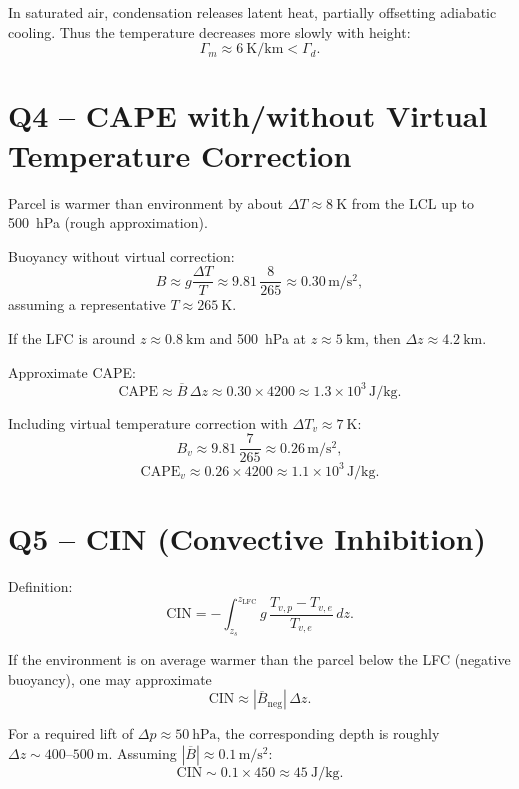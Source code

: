 \documentclass[12pt,a4paper]{article}
\begin{document}
In saturated air, condensation releases latent heat, partially
offsetting adiabatic cooling. Thus the temperature decreases more
slowly with height:
\[
\Gamma_m \approx \SI{6}{\kelvin\per\kilo\meter}
< \Gamma_d.
\]

\section*{Q4 -- CAPE with/without Virtual Temperature Correction}

Parcel is warmer than environment by about
\(\Delta T \approx \SI{8}{\kelvin}\) from the LCL up to \SI{500}{\hecto\pascal}
(rough approximation).

Buoyancy without virtual correction:
\[
B \approx g \frac{\Delta T}{T}
\approx 9.81 \,\frac{8}{265}
\approx 0.30 \,\si{\meter\per\second\squared},
\]
assuming a representative \(T \approx \SI{265}{\kelvin}\).

If the LFC is around \(z \approx \SI{0.8}{\kilo\meter}\) and
\SI{500}{\hecto\pascal} at \(z \approx \SI{5}{\kilo\meter}\),
then \(\Delta z \approx \SI{4.2}{\kilo\meter}\).

Approximate CAPE:
\[
\text{CAPE} \approx \overline{B}\,\Delta z
\approx 0.30 \times 4200
\approx 1.3\times 10^3 \,\si{\joule\per\kilo\gram}.
\]

Including virtual temperature correction with
\(\Delta T_v \approx \SI{7}{\kelvin}\):
\[
B_v \approx 9.81 \,\frac{7}{265}
\approx 0.26 \,\si{\meter\per\second\squared},
\]
\[
\text{CAPE}_v \approx 0.26 \times 4200
\approx 1.1\times 10^3 \,\si{\joule\per\kilo\gram}.
\]

\section*{Q5 -- CIN (Convective Inhibition)}

Definition:
\[
\text{CIN} = -\int_{z_s}^{z_{\text{LFC}}}
g\,\frac{T_{v,p} - T_{v,e}}{T_{v,e}}\,dz.
\]

If the environment is on average warmer than the parcel
below the LFC (negative buoyancy), one may approximate
\[
\text{CIN} \approx |\overline{B}_{\text{neg}}|\,\Delta z.
\]

For a required lift of \(\Delta p \approx \SI{50}{\hecto\pascal}\),
the corresponding depth is roughly
\(\Delta z \sim 400\text{--}\SI{500}{\meter}\).
Assuming \(|\overline{B}| \approx 0.1\,\si{\meter\per\second\squared}\):
\[
\text{CIN} \sim 0.1 \times 450
\approx \SI{45}{\joule\per\kilo\gram}.
\]
\end{document}
